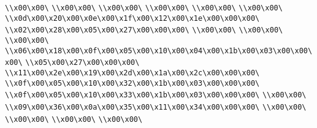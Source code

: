 \verb|\\x00\x00\|\newline
\verb|\\x00\x00\|\newline
\verb|\\x00\x00\|\newline
\verb|\\x00\x00\|\newline
\verb|\\x00\x00\|\newline
\verb|\\x00\x00\|\newline
\verb|\\x0d\x00\x20\x00\x0e\x00\x1f\x00\x12\x00\x1e\x00\x00\x00\|\newline
\verb|\\x02\x00\x28\x00\x05\x00\x27\x00\x00\x00\|\newline
\verb|\\x00\x00\|\newline
\verb|\\x00\x00\|\newline
\verb|\\x00\x00\|\newline
\verb|\\x06\x00\x18\x00\x0f\x00\x05\x00\x10\x00\x04\x00\x1b\x00\x03\x00\x00\x00\|\newline
\verb|\\x05\x00\x27\x00\x00\x00\|\newline
\verb|\\x11\x00\x2e\x00\x19\x00\x2d\x00\x1a\x00\x2c\x00\x00\x00\|\newline
\verb|\\x0f\x00\x05\x00\x10\x00\x32\x00\x1b\x00\x03\x00\x00\x00\|\newline
\verb|\\x0f\x00\x05\x00\x10\x00\x33\x00\x1b\x00\x03\x00\x00\x00\|\newline
\verb|\\x00\x00\|\newline
\verb|\\x09\x00\x36\x00\x0a\x00\x35\x00\x11\x00\x34\x00\x00\x00\|\newline
\verb|\\x00\x00\|\newline
\verb|\\x00\x00\|\newline
\verb|\\x00\x00\|\newline
\verb|\\x00\x00\|\newline

